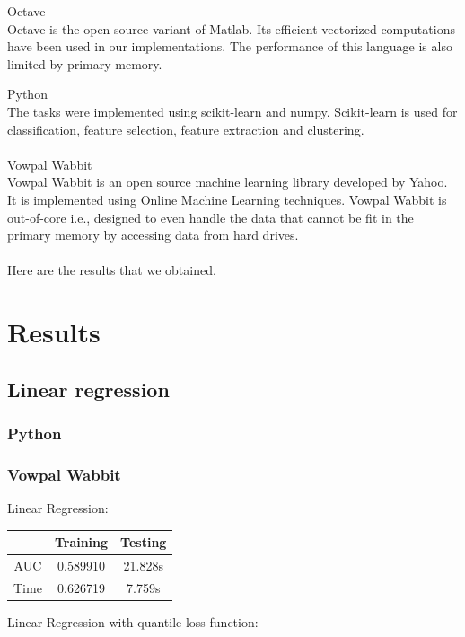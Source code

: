\documentclass[10pt]{article}
\begin{document}
Octave \\
Octave is the open-source variant of Matlab. Its efficient vectorized computations have been used in our implementations. The performance of this language is also limited by primary memory.

Python\\
The tasks were implemented using scikit-learn and numpy. Scikit-learn is used for classification, feature selection, feature extraction and clustering.\\\\

Vowpal Wabbit\\
Vowpal Wabbit is an open source machine learning library developed by Yahoo. It is implemented using Online Machine Learning techniques. Vowpal Wabbit is out-of-core i.e., designed to even handle the data that cannot be fit in the primary memory by accessing data from hard drives.\\\\

Here are the results that we obtained.

\section{Results}
\subsection{Linear regression}
\subsubsection{Python}
\subsubsection{Vowpal Wabbit}

Linear Regression:\\

\begin{center}
 \begin{tabular}{|c | c | c||} 
 \hline
 & Training & Testing\\ [0.5ex] 
 \hline\hline
AUC & 0.589910 & 21.828s\\ 
 \hline
Time & 0.626719 & 7.759s\\ 
 \hline
\end{tabular}
\end{center}

Linear Regression with quantile loss function:\\
\end{document}
